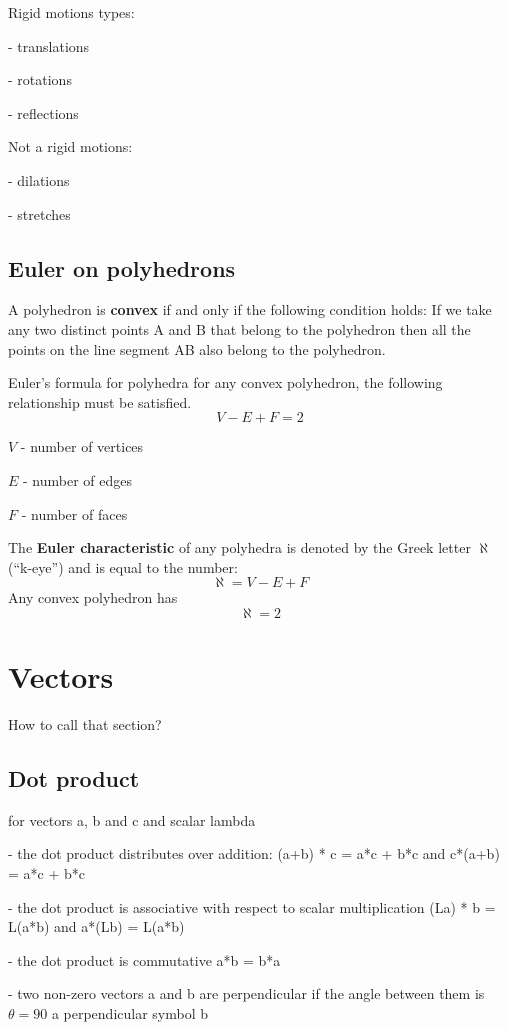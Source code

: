 \documentclass{article}
\begin{document}
Rigid motions types:

- translations

- rotations

- reflections


Not a rigid motions:

- dilations

- stretches

\subsection{Euler on polyhedrons}
A polyhedron is \textbf{convex} if and only if the following condition
holds:
If we take any two distinct points A and B that belong to the polyhedron
then all the points on the line segment AB also belong to the polyhedron.

Euler's formula for polyhedra for any convex polyhedron, the following
relationship must be satisfied.
\begin{equation}
  V - E + F = 2
\end{equation}

$V$ - number of vertices

$E$ - number of edges

$F$ - number of faces

The \textbf{Euler characteristic} of any polyhedra is denoted by the
Greek letter $\aleph$ (``k-eye'') and is equal to the number:
\begin{equation}
  \aleph = V - E + F
\end{equation}
Any convex polyhedron has
\begin{equation}
  \aleph = 2
\end{equation}
\section{Vectors}
How to call that section?
\subsection{Dot product}
for vectors a, b and c and scalar lambda

- the dot product distributes over addition:
(a+b) * c = a*c + b*c
and
c*(a+b) = a*c + b*c

- the dot product is associative with respect to scalar multiplication
(La) * b = L(a*b)
and
a*(Lb) = L(a*b)

- the dot product is commutative
a*b = b*a

- two non-zero vectors a and b are perpendicular if the angle between them is $\theta = 90$
a perpendicular symbol b
\end{document}
